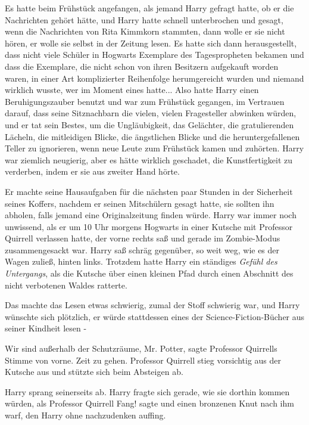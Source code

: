 Es hatte beim Frühstück angefangen, als jemand Harry gefragt hatte, ob er die
Nachrichten gehört hätte, und Harry hatte schnell unterbrochen und gesagt, wenn
die Nachrichten von Rita Kimmkorn stammten, dann wolle er sie nicht hören, er
wolle sie selbst in der Zeitung lesen. Es hatte sich dann herausgestellt, dass
nicht viele Schüler in Hogwarts Exemplare des Tagespropheten bekamen und dass
die Exemplare, die nicht schon von ihren Besitzern aufgekauft worden waren, in
einer Art komplizierter Reihenfolge herumgereicht wurden und niemand wirklich
wusste, wer im Moment eines hatte... Also hatte Harry einen Beruhigungszauber
benutzt und war zum Frühstück gegangen, im Vertrauen darauf, dass seine
Sitznachbarn die vielen, vielen Fragesteller abwinken würden, und er tat sein
Bestes, um die Ungläubigkeit, das Gelächter, die gratulierenden Lächeln, die
mitleidigen Blicke, die ängstlichen Blicke und die heruntergefallenen Teller zu
ignorieren, wenn neue Leute zum Frühstück kamen und zuhörten. Harry war ziemlich
neugierig, aber es hätte wirklich geschadet, die Kunstfertigkeit zu verderben,
indem er sie aus zweiter Hand hörte.

Er machte seine Hausaufgaben für die nächsten paar Stunden in der Sicherheit
seines Koffers, nachdem er seinen Mitschülern gesagt hatte, sie sollten ihn
abholen, falls jemand eine Originalzeitung finden würde. Harry war immer noch
unwissend, als er um 10 Uhr morgens Hogwarts in einer Kutsche mit Professor
Quirrell verlassen hatte, der vorne rechts saß und gerade im Zombie-Modus
zusammengesackt war. Harry saß schräg gegenüber, so weit weg, wie es der Wagen
zuließ, hinten links. Trotzdem hatte Harry ein ständiges \emph{Gefühl des
Untergangs}, als die Kutsche über einen kleinen Pfad durch einen Abschnitt des
nicht verbotenen Waldes ratterte.

Das machte das Lesen etwas schwierig, zumal der Stoff schwierig war, und Harry
wünschte sich plötzlich, er würde stattdessen eines der Science-Fiction-Bücher
aus seiner Kindheit lesen -

\glqq Wir sind außerhalb der Schutzräume, Mr. Potter\grqq{}, sagte Professor
Quirrells Stimme von vorne. \glqq Zeit zu gehen.\grqq{} Professor Quirrell stieg
vorsichtig aus der Kutsche aus und stützte sich beim Absteigen ab.

Harry sprang seinerseits ab. Harry fragte sich gerade, wie sie dorthin kommen
würden, als Professor Quirrell \glqq Fang!\grqq{} sagte und einen bronzenen Knut
nach ihm warf, den Harry ohne nachzudenken auffing.

